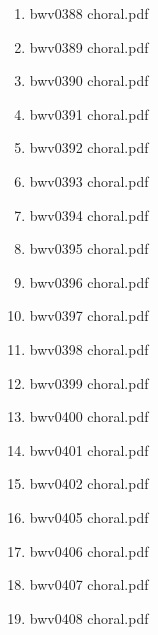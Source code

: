 \documentclass[11pt]{article}
\begin{document}
\begin{enumerate}
\begin{enumerate}
\begin{enumerate}
\begin{enumerate}
\item bwv0388 choral.pdf
\label{sec-1-1-1-1-44-6-7-2-4-137}

\item bwv0389 choral.pdf
\label{sec-1-1-1-1-44-6-7-2-4-138}

\item bwv0390 choral.pdf
\label{sec-1-1-1-1-44-6-7-2-4-139}

\item bwv0391 choral.pdf
\label{sec-1-1-1-1-44-6-7-2-4-140}

\item bwv0392 choral.pdf
\label{sec-1-1-1-1-44-6-7-2-4-141}

\item bwv0393 choral.pdf
\label{sec-1-1-1-1-44-6-7-2-4-142}

\item bwv0394 choral.pdf
\label{sec-1-1-1-1-44-6-7-2-4-143}

\item bwv0395 choral.pdf
\label{sec-1-1-1-1-44-6-7-2-4-144}

\item bwv0396 choral.pdf
\label{sec-1-1-1-1-44-6-7-2-4-145}

\item bwv0397 choral.pdf
\label{sec-1-1-1-1-44-6-7-2-4-146}

\item bwv0398 choral.pdf
\label{sec-1-1-1-1-44-6-7-2-4-147}

\item bwv0399 choral.pdf
\label{sec-1-1-1-1-44-6-7-2-4-148}

\item bwv0400 choral.pdf
\label{sec-1-1-1-1-44-6-7-2-4-149}

\item bwv0401 choral.pdf
\label{sec-1-1-1-1-44-6-7-2-4-150}

\item bwv0402 choral.pdf
\label{sec-1-1-1-1-44-6-7-2-4-151}

\item bwv0405 choral.pdf
\label{sec-1-1-1-1-44-6-7-2-4-152}

\item bwv0406 choral.pdf
\label{sec-1-1-1-1-44-6-7-2-4-153}

\item bwv0407 choral.pdf
\label{sec-1-1-1-1-44-6-7-2-4-154}

\item bwv0408 choral.pdf
\label{sec-1-1-1-1-44-6-7-2-4-155}


\end{enumerate}
\end{enumerate}
\end{enumerate}
\end{enumerate}
\end{document}
